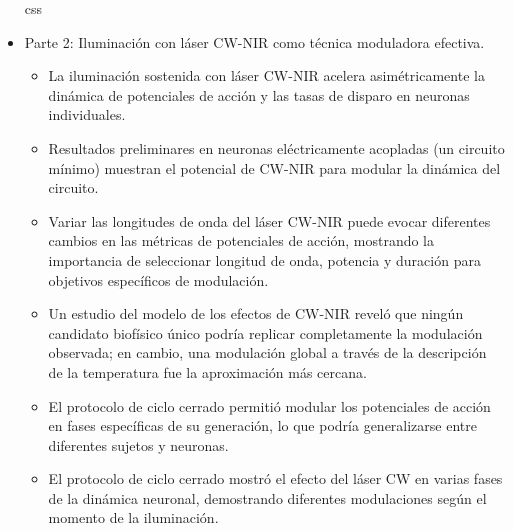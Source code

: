 \begin{itemize}
	css
	
	\item Parte 2: Iluminación con láser CW-NIR como técnica moduladora efectiva.
	\begin{itemize}
		\item La iluminación sostenida con láser CW-NIR acelera asimétricamente la dinámica de potenciales de acción y las tasas de disparo en neuronas individuales.
		\item Resultados preliminares en neuronas eléctricamente acopladas (un circuito mínimo) muestran el potencial de CW-NIR para modular la dinámica del circuito.
		\item Variar las longitudes de onda del láser CW-NIR puede evocar diferentes cambios en las métricas de potenciales de acción, mostrando la importancia de seleccionar longitud de onda, potencia y duración para objetivos específicos de modulación.
		\item Un estudio del modelo de los efectos de CW-NIR reveló que ningún candidato biofísico único podría replicar completamente la modulación observada; en cambio, una modulación global a través de la descripción de la temperatura fue la aproximación más cercana.
		\item El protocolo de ciclo cerrado permitió modular los potenciales de acción en fases específicas de su generación, lo que podría generalizarse entre diferentes sujetos y neuronas.
		\item El protocolo de ciclo cerrado mostró el efecto del láser CW en varias fases de la dinámica neuronal, demostrando diferentes modulaciones según el momento de la iluminación.
	\end{itemize}
	
\end{itemize}
